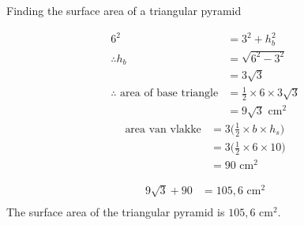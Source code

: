 \begin{wex}{Finding the surface area of a triangular pyramid}
{\begin{align*}
6^2 &= 3^2+h_b^2\\
\therefore h_b&=\sqrt{6^2-3^2}\\
&=3\sqrt{3}\\
\therefore \mbox{ area of base triangle} &= \frac{1}{2} \times 6 \times 3\sqrt{3}\\
&=9\sqrt{3}\mbox{ cm}^2
\end{align*}
\begin{align*}
 \mbox{area van vlakke} &= 3\Big(\frac{1}{2} \times b\times h_s\Big)\\
&=3\Big(\frac{1}{2} \times 6 \times 10\Big)\\
&=90\mbox{ cm}^2
\end{align*}

\begin{align*}
9\sqrt{3} + 90&=105,6\mbox{ cm}^2\\

\end{align*}
The surface area of the triangular pyramid is $105,6$ cm$^{2}$.
}
\end{wex}

